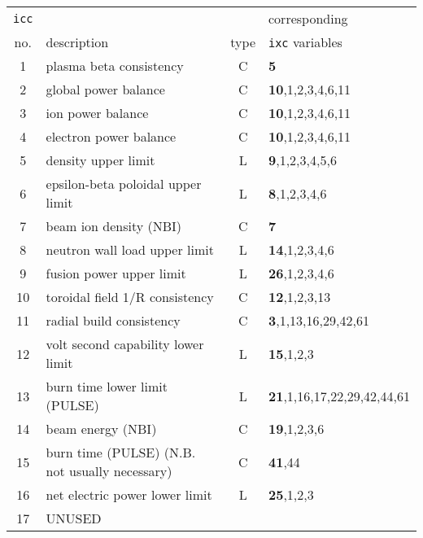 \documentclass[11pt,a4paper]{report}
\begin{document}
\begin{table}[tbph]
\begin{center}
\begin{tabular}{||c|l|c|l||} \hline
\texttt{icc} &                                                  &      & corresponding \\
no. & description                                               & type & \texttt{ixc} variables \\ \hline
1   & plasma beta consistency                                   & C    & \textbf{5} \\
2   & global power balance                                      & C    & \textbf{10},1,2,3,4,6,11 \\
3   & ion power balance                                         & C    & \textbf{10},1,2,3,4,6,11 \\
4   & electron power balance                                    & C    & \textbf{10},1,2,3,4,6,11 \\
5   & density upper limit                                       & L    & \textbf{9},1,2,3,4,5,6 \\
6   & epsilon-beta poloidal upper limit                         & L    & \textbf{8},1,2,3,4,6 \\
7   & beam ion density (NBI)                                    & C    & \textbf{7} \\
8   & neutron wall load upper limit                             & L    & \textbf{14},1,2,3,4,6 \\
9   & fusion power upper limit                                  & L    & \textbf{26},1,2,3,4,6 \\
10  & toroidal field 1/R consistency                            & C    & \textbf{12},1,2,3,13 \\
11  & radial build consistency                                  & C    & \textbf{3},1,13,16,29,42,61 \\
12  & volt second capability lower limit                        & L    & \textbf{15},1,2,3 \\
13  & burn time lower limit (PULSE)                             & L    & \textbf{21},1,16,17,22,29,42,44,61 \\
14  & beam energy (NBI)                                         & C    & \textbf{19},1,2,3,6 \\
15  & burn time (PULSE) (N.B. not usually necessary)            & C    & \textbf{41},44 \\
16  & net electric power lower limit                            & L    & \textbf{25},1,2,3 \\
17  & UNUSED                                                    &      & \\

\end{tabular}
\end{center}
\end{table}
\end{document}
